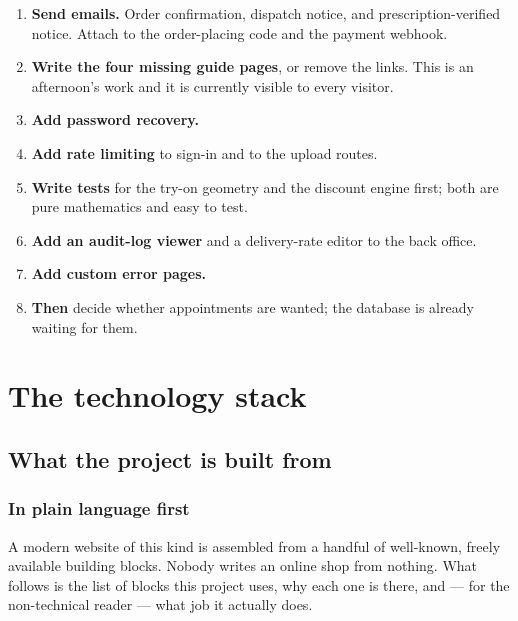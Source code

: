 \documentclass[11pt,a4paper]{report}
\begin{document}
\begin{enumerate}
  \item \textbf{Send emails.} Order confirmation, dispatch notice, and
        prescription-verified notice. Attach to the order-placing code and the
        payment webhook.
  \item \textbf{Write the four missing guide pages}, or remove the links.
        This is an afternoon's work and it is currently visible to every
        visitor.
  \item \textbf{Add password recovery.}
  \item \textbf{Add rate limiting} to sign-in and to the upload routes.
  \item \textbf{Write tests} for the try-on geometry and the discount engine
        first; both are pure mathematics and easy to test.
  \item \textbf{Add an audit-log viewer} and a delivery-rate editor to the
        back office.
  \item \textbf{Add custom error pages.}
  \item \textbf{Then} decide whether appointments are wanted; the database is
        already waiting for them.
\end{enumerate}

\part{The technology stack}

\chapter{What the project is built from}

\section{In plain language first}

A modern website of this kind is assembled from a handful of well-known,
freely available building blocks. Nobody writes an online shop from nothing.
What follows is the list of blocks this project uses, why each one is there,
and --- for the non-technical reader --- what job it actually does.
\end{document}
